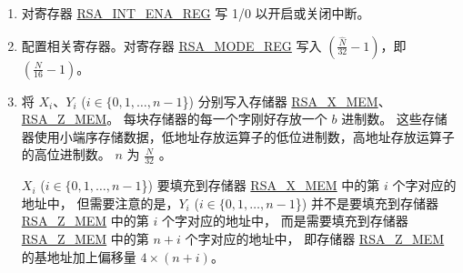 \documentclass[main\_\_CN.tex]{subfiles}
\begin{document}
\begin{enumerate}

    \item 对寄存器 \hyperref[regdesc:RSAINTENAREG]{RSA\_INT\_ENA\_REG} 写 1/0 以开启或关闭中断。

    \item 配置相关寄存器。对寄存器 \hyperref[regdesc:RSAMODEREG]{RSA\_MODE\_REG} 写入 \begin{math}( \frac{\hat{N}}{32} - 1 )\end{math}，即 \begin{math}(  \frac{N}{16} - 1 )\end{math}。

    \item 将 \begin{math}{X}_{i}\end{math}、\begin{math}{Y}_{i}\end{math} (\begin{math}i \in \{ 0, 1, \dots, n-1 \end{math}\}) 分别写入存储器 \hyperref[regdesc:RSAmemory]{RSA\_X\_MEM}、\hyperref[regdesc:RSAmemory]{RSA\_Z\_MEM}。
        每块存储器的每一个字刚好存放一个 \begin{math}b\end{math} 进制数。
        这些存储器使用小端序存储数据，低地址存放运算子的低位进制数，高地址存放运算子的高位进制数。
        \begin{math}n\end{math} 为 \begin{math} \frac{N}{32} \end{math} 。

         \begin{math}{X}_{i}\end{math} (\begin{math}i \in \{ 0, 1, \dots, n-1 \end{math}\}) 要填充到存储器 \hyperref[regdesc:RSAmemory]{RSA\_X\_MEM} 中的第 \begin{math}i\end{math} 个字对应的地址中，
        但需要注意的是，\begin{math}{Y}_{i}\end{math} (\begin{math}i\in\{ 0, 1, \dots, n-1 \end{math}\}) 并不是要填充到存储器 \hyperref[regdesc:RSAmemory]{RSA\_Z\_MEM} 中的第 \begin{math}i\end{math} 个字对应的地址中，
        而是需要填充到存储器 \hyperref[regdesc:RSAmemory]{RSA\_Z\_MEM} 中的第 \begin{math}n+i\end{math} 个字对应的地址中，
        即存储器 \hyperref[regdesc:RSAmemory]{RSA\_Z\_MEM} 的基地址加上偏移量 \begin{math}4 \times (n+i) \end{math}。


\end{enumerate}
\end{document}
